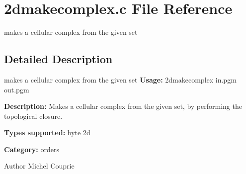 \section{2dmakecomplex.c File Reference}
\label{2dmakecomplex_8c}


makes a cellular complex from the given set  




\subsection{Detailed Description}
makes a cellular complex from the given set {\bfseries Usage:} 2dmakecomplex in.pgm out.pgm

{\bfseries Description:} Makes a cellular complex from the given set, by performing the topological closure.

{\bfseries Types supported:} byte 2d

{\bfseries Category:} orders

\begin{DoxyAuthor}{Author}
Michel Couprie 
\end{DoxyAuthor}
